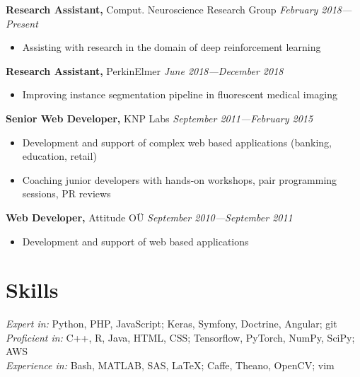\documentclass[margin,line]{res}
\begin{document}
\begin{resume}
{\bf Research Assistant,} Comput. Neuroscience Research Group \hfill {\it February 2018---Present}\\
\vspace*{-.1in}
\begin{itemize}
\item[ ] Assisting with research in the domain of deep reinforcement learning
\end{itemize}
\vspace*{-.05in}

{\bf Research Assistant,} PerkinElmer \hfill {\it June 2018---December 2018}\\
\vspace*{-.1in}
\begin{itemize}
\item[ ] Improving instance segmentation pipeline in fluorescent medical imaging
\end{itemize}
\vspace*{-.05in}

{\bf Senior Web Developer,} KNP Labs \hfill {\it September 2011---February 2015}\\
\vspace*{-.1in}
\begin{itemize}
\item[ ] Development and support of complex web based applications (banking, education, retail)
\item[ ] Coaching junior developers with hands-on workshops, pair programming sessions, PR reviews 
\end{itemize}
\vspace*{-.05in}
{\bf Web Developer,} Attitude OÜ \hfill {\it September 2010---September 2011}\\
\vspace*{-.1in}
\begin{itemize}
\item[ ] Development and support of web based applications
\end{itemize}


\section{\sc Skills}
{\it Expert in:} Python, PHP, JavaScript; Keras, Symfony, Doctrine, Angular; git
\vspace*{+.01in}\\
{\it Proficient in:} C++, R, Java, HTML, CSS; Tensorflow, PyTorch, NumPy, SciPy; AWS
\vspace*{+.01in}\\
{\it Experience in:} Bash, MATLAB, SAS, LaTeX; Caffe, Theano, OpenCV; vim


\end{resume}
\end{document}

